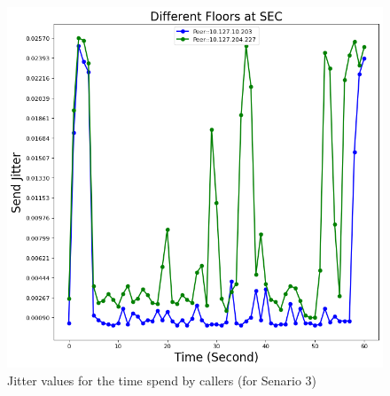 	\begin{figure}[!b]
		\begin{minipage}{\textwidth}
			\includegraphics[scale=0.38]{Images/experiment/senarios/df_diff_floor.png}
		\end{minipage}
		\caption{Jitter values for the time spend by callers (for Senario 3)}
		\label{fig:scene-out-3}
	\end{figure}


